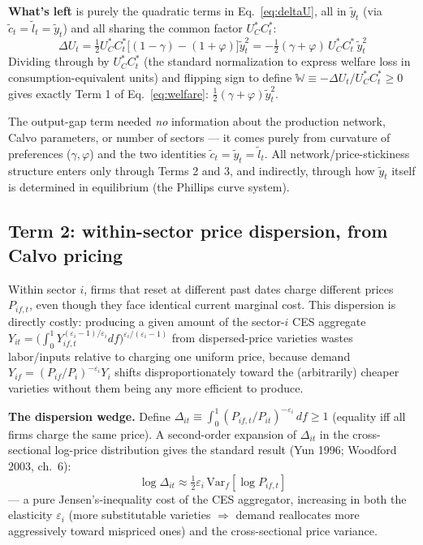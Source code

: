 \documentclass[12pt]{article}
\begin{document}
\textbf{What's left} is purely the quadratic terms in Eq.~\eqref{eq:deltaU}, all in $\tilde y_t$ (via $\tilde c_t=\tilde l_t=\tilde y_t$) and all sharing the common factor $U_C^*C_t^*$:
\begin{equation}
    \Delta U_t = \tfrac{1}{2}U_C^*C_t^*\Big[(1-\gamma) - (1+\varphi)\Big]\tilde y_t^2
    = -\tfrac{1}{2}(\gamma+\varphi)\,U_C^*C_t^*\,\tilde y_t^2
\end{equation}
Dividing through by $U_C^*C_t^*$ (the standard normalization to express welfare loss in
consumption-equivalent units) and flipping sign to define $\mathbb{W}\equiv -\Delta U_t/U_C^*C_t^*
\geq 0$ gives exactly Term 1 of Eq.~\eqref{eq:welfare}: $\tfrac12(\gamma+\varphi)\tilde y_t^2$.

\begin{insight}
The output-gap term needed \emph{no} information about the production network, Calvo parameters, or
number of sectors — it comes purely from curvature of preferences ($\gamma,\varphi$) and the two
identities $\tilde c_t=\tilde y_t=\tilde l_t$. All network/price-stickiness structure enters only
through Terms 2 and 3, and indirectly, through how $\tilde y_t$ itself is determined in equilibrium
(the Phillips curve system).
\end{insight}

\subsection{Term 2: within-sector price dispersion, from Calvo pricing}

Within sector $i$, firms that reset at different past dates charge different prices $P_{if,t}$, even
though they face identical current marginal cost. This dispersion is directly costly: producing a
given amount of the sector-$i$ CES aggregate $Y_{it}=\big(\int_0^1 Y_{if,t}^{(\varepsilon_i-1)/\varepsilon_i}df\big)^{\varepsilon_i/(\varepsilon_i-1)}$
from dispersed-price varieties wastes labor/inputs relative to charging one uniform price, because
demand $Y_{if}=(P_{if}/P_i)^{-\varepsilon_i}Y_i$ shifts disproportionately toward the (arbitrarily)
cheaper varieties without them being any more efficient to produce.

\textbf{The dispersion wedge.} Define $\Delta_{it} \equiv \int_0^1 (P_{if,t}/P_{it})^{-\varepsilon_i}\,df \geq 1$
(equality iff all firms charge the same price). A second-order expansion of $\Delta_{it}$ in the
cross-sectional log-price distribution gives the standard result (Yun 1996; Woodford 2003, ch.~6):
\begin{equation}
    \log \Delta_{it} \approx \tfrac{1}{2}\varepsilon_i\,\mathrm{Var}_f[\log P_{if,t}]
    \label{eq:dispersion_wedge}
\end{equation}
— a pure Jensen's-inequality cost of the CES aggregator, increasing in both the elasticity
$\varepsilon_i$ (more substitutable varieties $\Rightarrow$ demand reallocates more aggressively
toward mispriced ones) and the cross-sectional price variance.
\end{document}
